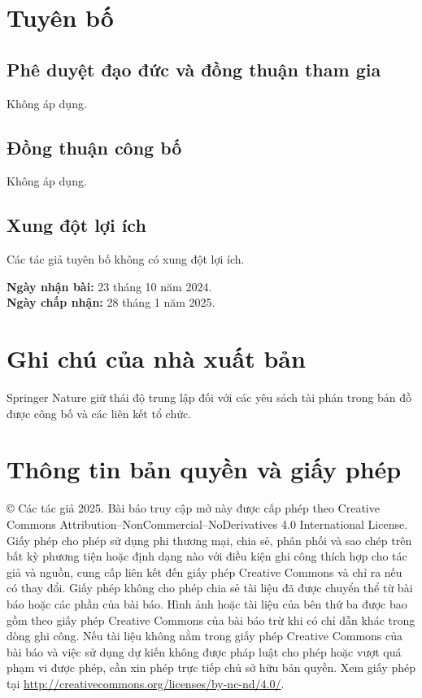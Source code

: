 \section{Tuyên bố}
\subsection*{Phê duyệt đạo đức và đồng thuận tham gia}
Không áp dụng.

\subsection*{Đồng thuận công bố}
Không áp dụng.

\subsection*{Xung đột lợi ích}
Các tác giả tuyên bố không có xung đột lợi ích.

\noindent\textbf{Ngày nhận bài:} 23 tháng 10 năm 2024.\\
\textbf{Ngày chấp nhận:} 28 tháng 1 năm 2025.

\section*{Ghi chú của nhà xuất bản}
Springer Nature giữ thái độ trung lập đối với các yêu sách tài phán trong bản đồ được công bố và các liên kết tổ chức.

\section*{Thông tin bản quyền và giấy phép}
© Các tác giả 2025. Bài báo truy cập mở này được cấp phép theo Creative Commons Attribution--NonCommercial--NoDerivatives 4.0 International License. Giấy phép cho phép sử dụng phi thương mại, chia sẻ, phân phối và sao chép trên bất kỳ phương tiện hoặc định dạng nào với điều kiện ghi công thích hợp cho tác giả và nguồn, cung cấp liên kết đến giấy phép Creative Commons và chỉ ra nếu có thay đổi. Giấy phép không cho phép chia sẻ tài liệu đã được chuyển thể từ bài báo hoặc các phần của bài báo. Hình ảnh hoặc tài liệu của bên thứ ba được bao gồm theo giấy phép Creative Commons của bài báo trừ khi có chỉ dẫn khác trong dòng ghi công. Nếu tài liệu không nằm trong giấy phép Creative Commons của bài báo và việc sử dụng dự kiến không được pháp luật cho phép hoặc vượt quá phạm vi được phép, cần xin phép trực tiếp chủ sở hữu bản quyền. Xem giấy phép tại \url{http://creativecommons.org/licenses/by-nc-nd/4.0/}.
